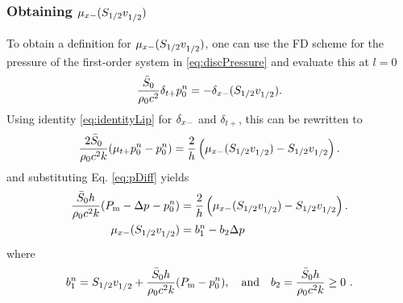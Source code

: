\subsubsection{Obtaining $\mu_{x-}(S_{1/2}v_{1/2}^{})$}
To obtain a definition for $\mu_{x-}(S_{1/2}v_{1/2}^{})$, one can use the FD scheme for the pressure of the first-order system in \eqref{eq:discPressure} and evaluate this at $l = 0$
\begin{equation}
    \frac{\bar S_0}{\rho_0 c^2}\delta_{t+}p_0^n = -\delta_{x-}(S_{1/2}v_{1/2}^{}).
\end{equation}
Using identity \eqref{eq:identityLip} for $\delta_{x-}$ and $\delta_{t+}$, this can be rewritten to
\begin{equation}
    \frac{2\bar S_0}{\rho_0 c^2k}(\mu_{t+}p_0^n-p_0^n) = \frac{2}{h} \left(\mu_{x-}(S_{1/2}v_{1/2}^{})-S_{1/2}v_{1/2}^{}\right).
\end{equation}
and substituting Eq. \eqref{eq:pDiff} yields
\begin{align}
    \frac{\bar S_0h}{\rho_0 c^2k}(P_\text{m} - \Delta p^{}-p_0^n) &= \frac{2}{h} \left(\mu_{x-}(S_{1/2}v_{1/2}^{})-S_{1/2}v_{1/2}^{}\right).\nonumber\\
    \mu_{x-}(S_{1/2}v_{1/2}^{}) &= b_1^n - b_2\Delta p^{}\label{eq:bEquation}
\end{align}
where
\begin{equation}\label{eq:bCoeffs}
    b_1^n = S_{1/2}v_{1/2}^{} + \frac{\bar S_0h}{\rho_0 c^2k} (P_\text{m} - p_0^n), \quad \text{and} \quad b_2 = \frac{\bar S_0h}{\rho_0 c^2k} \geq 0\ .
\end{equation}
